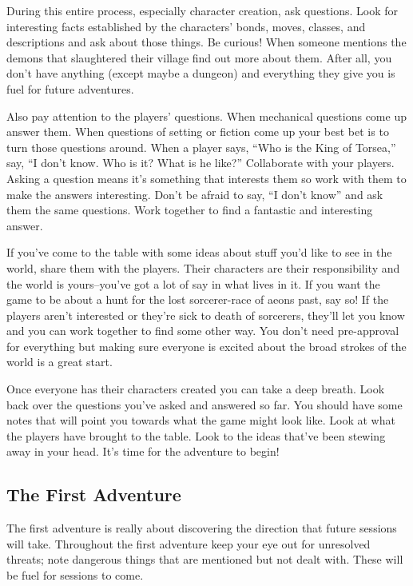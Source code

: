  During this entire process, especially character creation, ask questions. Look for interesting facts established by the characters' bonds, moves, classes, and descriptions and ask about those things. Be curious! When someone mentions the demons that slaughtered their village find out more about them. After all, you don't have anything (except maybe a dungeon) and everything they give you is fuel for future adventures.


 Also pay attention to the players' questions. When mechanical questions come up answer them. When questions of setting or fiction come up your best bet is to turn those questions around. When a player says, ``Who is the King of Torsea,'' say, ``I don't know. Who is it? What is he like?'' Collaborate with your players. Asking a question means it's something that interests them so work with them to make the answers interesting. Don't be afraid to say, ``I don't know'' and ask them the same questions. Work together to find a fantastic and interesting answer.


 If you've come to the table with some ideas about stuff you'd like to see in the world, share them with the players. Their characters are their responsibility and the world is yours--you've got a lot of say in what lives in it. If you want the game to be about a hunt for the lost sorcerer-race of aeons past, say so! If the players aren't interested or they're sick to death of sorcerers, they'll let you know and you can work together to find some other way. You don't need pre-approval for everything but making sure everyone is excited about the broad strokes of the world is a great start.


 Once everyone has their characters created you can take a deep breath. Look back over the questions you've asked and answered so far. You should have some notes that will point you towards what the game might look like. Look at what the players have brought to the table. Look to the ideas that've been stewing away in your head. It's time for the adventure to begin!
\subsection{The First Adventure}


 The first adventure is really about discovering the direction that future sessions will take. Throughout the first adventure keep your eye out for unresolved threats; note dangerous things that are mentioned but not dealt with. These will be fuel for sessions to come.


